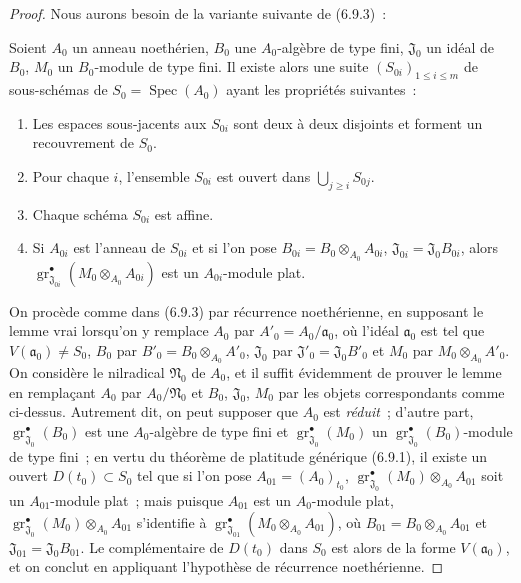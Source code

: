 \begin{proof}
Nous aurons besoin de la variante suivante de (6.9.3)~:

\begin{lemma}[11.2.9.5]
\label{IV.11.2.9.5-fr}
Soient $A_0$ un anneau noethérien, $B_0$ une $A_0$-algèbre de type fini,
$\mathfrak J_0$ un idéal de $B_0$, $M_0$ un $B_0$-module de type fini. Il
existe alors une suite $(S_{0i})_{1\leq i\leq m}$ de sous-schémas de
$S_0=\operatorname{Spec}(A_0)$ ayant les propriétés suivantes~:
\begin{enumerate}[label=\textup{\arabic{enumi}}$^\circ$]
\item Les espaces sous-jacents aux $S_{0i}$ sont deux à deux disjoints et
forment un recouvrement de $S_0$.
\item Pour chaque $i$, l'ensemble $S_{0i}$ est ouvert dans
$\bigcup_{j\geq i}S_{0j}$.
\item Chaque schéma $S_{0i}$ est affine.
\item Si $A_{0i}$ est l'anneau de $S_{0i}$ et si l'on pose
$B_{0i}=B_0\otimes_{A_0}A_{0i}$, $\mathfrak J_{0i}=\mathfrak J_0B_{0i}$,
alors
$\operatorname{gr}_{\mathfrak J_{0i}}^\bullet(M_0\otimes_{A_0}A_{0i})$ est un
$A_{0i}$-module plat.
\end{enumerate}
\end{lemma}

On procède comme dans (6.9.3) par récurrence noethérienne, en supposant le
lemme vrai lorsqu'on y remplace $A_0$ par $A'_0=A_0/\mathfrak a_0$, où
l'idéal $\mathfrak a_0$ est tel que $V(\mathfrak a_0)\neq S_0$, $B_0$ par
$B'_0=B_0\otimes_{A_0}A'_0$, $\mathfrak J_0$ par
$\mathfrak J'_0=\mathfrak J_0B'_0$ et $M_0$ par $M_0\otimes_{A_0}A'_0$. On
considère le nilradical $\mathfrak N_0$ de $A_0$, et il suffit évidemment de
prouver le lemme en remplaçant $A_0$ par $A_0/\mathfrak N_0$ et $B_0$,
$\mathfrak J_0$, $M_0$ par les objets correspondants comme ci-dessus.
Autrement dit, on peut supposer que $A_0$ est \emph{réduit}~; d'autre part,
$\operatorname{gr}_{\mathfrak J_0}^\bullet(B_0)$ est une $A_0$-algèbre de type fini
et $\operatorname{gr}_{\mathfrak J_0}^\bullet(M_0)$ un
$\operatorname{gr}_{\mathfrak J_0}^\bullet(B_0)$-module de type fini~; en vertu du
théorème de platitude générique (6.9.1), il existe un ouvert
$D(t_0)\subset S_0$ tel que si l'on pose $A_{01}=(A_0)_{t_0}$,
$\operatorname{gr}_{\mathfrak J_0}^\bullet(M_0)\otimes_{A_0}A_{01}$ soit un
$A_{01}$-module plat~; mais puisque $A_{01}$ est un $A_0$-module plat,
$\operatorname{gr}_{\mathfrak J_0}^\bullet(M_0)\otimes_{A_0}A_{01}$ s'identifie à
$\operatorname{gr}_{\mathfrak J_{01}}^\bullet(M_0\otimes_{A_0}A_{01})$, où
$B_{01}=B_0\otimes_{A_0}A_{01}$ et $\mathfrak J_{01}=\mathfrak J_0B_{01}$.
Le complémentaire de $D(t_0)$ dans $S_0$ est alors de la forme
$V(\mathfrak a_0)$, et on conclut en appliquant l'hypothèse de récurrence
noethérienne.


\end{proof}
